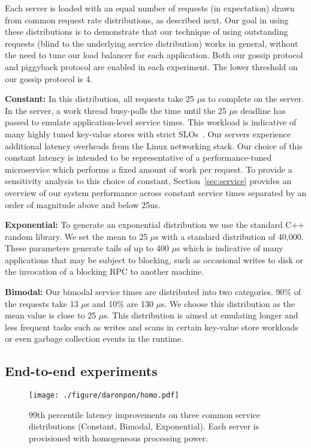 Each server is loaded with an equal number of requests (in expectation)
drawn from common request rate distributions, as described next.
Our goal in using these distributions is to demonstrate that
our technique of using outstanding requests (blind to the underlying
service distribution) works in general, without the need to tune
our load balancer for each application.  Both our gossip protocol and
piggyback protocol are enabled in each experiment. The lower threshold
on our gossip protocol is 4.

\noindent\textbf{Constant:} In this distribution, all requests take 25 $\mu$s to
complete on the server.  In the server, a work thread busy-polls the time until
the 25 $\mu$s deadline has passed to emulate application-level service times.
This workload is indicative of many highly tuned key-value stores with strict
SLOs~\cite{memcached,rocksdb}.  Our servers experience additional latency
overheads from the Linux networking stack.  Our choice of this constant latency
is intended to be representative of a performance-tuned microservice which
performs a fixed amount of work per request.  To provide a sensitivity analysis
to this choice of constant, Section~\ref{sec:service} provides an overview of
our system performance across constant service times separated by an order of
magnitude above and below 25us.

\noindent\textbf{Exponential:} To generate an exponential distribution we use the
standard C++ random library. We set the mean to 25 $\mu$s with a standard
distribution of 40,000. These parameters generate tails of up to 400 $\mu$s
which is indicative of many applications that may be subject to blocking, such
as occasional writes to disk or the invocation of a blocking RPC to another
machine.

\noindent\textbf{Bimodal:} Our bimodal service times are distributed into two
categories. 90\% of the requests take 13 $\mu$s and 10\% are 130 $\mu$s.  We
choose this distribution as the mean value is close to 25 $\mu$s. This
distribution is aimed at emulating longer and less frequent tasks such as
writes and scans in certain key-value store workloads or even garbage
collection events in the runtime.

\subsection{End-to-end experiments}

\begin{figure*}
  \texttt{[image: ./figure/daronpon/homo.pdf]}
  \caption{99th percentile latency improvements on three common
    service distributions (Constant, Bimodal, Exponential). Each
    server is provisioned with homogeneous processing power.}
  \label{fig:homo}
\end{figure*}

